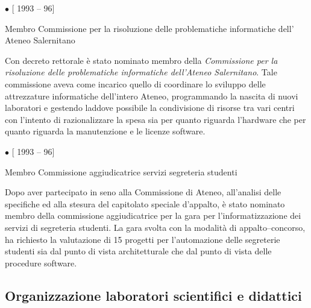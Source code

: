 \documentclass[11pt]{article}
\newlength{\posii}
\newlength{\posiibox}
\newlength{\boxsize}
\begin{document}
\begin{description}
\item \parbox[t]{\posiibox}
{\bf  \raggedright $ \bullet $  [ 1993 -- 96] \par
\medskip
Membro Commissione per la risoluzione delle problematiche informatiche
dell' Ateneo Salernitano}
\hfill \parbox[t]{\boxsize} {
Con decreto rettorale \`e stato nominato membro della {\sl Commissione
per la risoluzione delle problematiche informatiche dell'Ateneo
Salernitano}. Tale commissione aveva come incarico quello di
coordinare lo sviluppo delle attrezzature informatiche dell'intero
Ateneo, programmando la nascita di nuovi laboratori e gestendo laddove
possibile la condivisione di risorse tra vari centri con l'intento di
razionalizzare la spesa sia per quanto riguarda l'hardware che per
quanto riguarda la manutenzione e le licenze software.}


\item \parbox[t]{\posiibox}
{\bf \raggedright $ \bullet $  [ 1993 -- 96] \par
\medskip
Membro Commissione aggiudicatrice servizi segreteria studenti}
\hfill \parbox[t]{\boxsize} {
Dopo aver partecipato in seno alla Commissione di Ateneo, all'analisi
delle specifiche ed alla stesura del capitolato speciale d'appalto,
\`e stato nominato membro della commissione aggiudicatrice per la gara
per l'informatizzazione dei servizi di segreteria studenti. La gara
svolta con la modalit\`a di appalto--concorso, ha richiesto la
valutazione di 15 progetti per l'automazione delle segreterie studenti
sia dal punto di vista architetturale che dal punto di vista delle
procedure software.}
\end{description}

\subsection{Organizzazione laboratori scientifici e didattici}
\end{document}
